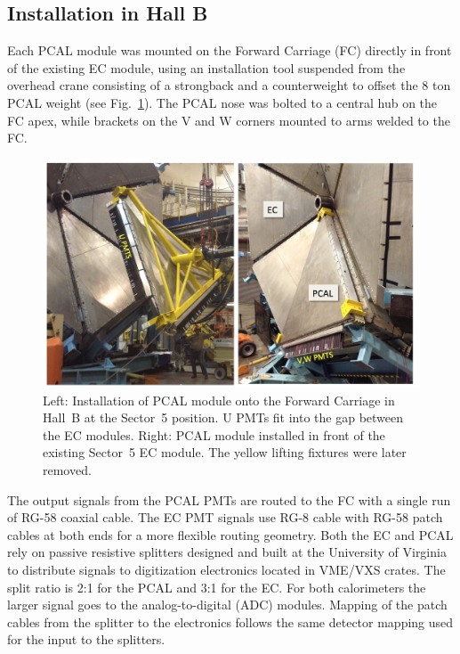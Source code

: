 \subsection{Installation in Hall B}

Each PCAL module was mounted on the Forward Carriage (FC) directly in front of the existing EC module, using
an installation tool suspended from the overhead crane consisting of a strongback and a counterweight to offset
the 8 ton PCAL weight (see Fig.~\ref{fig:S5_1}). The PCAL nose was bolted to a central hub on the FC apex, while
brackets on the V and W corners mounted to arms welded to the FC.   

\begin{figure}[hbt]
\centering
\includegraphics[width=0.95\columnwidth,keepaspectratio]{img/S5_1.png}
\caption{Left: Installation of PCAL module onto the Forward Carriage in Hall~B at the Sector~5 position. U PMTs
  fit into the gap between the EC modules. Right: PCAL module installed in front of the existing Sector~5 EC
  module. The yellow lifting fixtures were later removed.}
\label{fig:S5_1}
\end{figure}

The output signals from the PCAL PMTs are routed to the FC with a single run of RG-58 coaxial cable. The EC PMT
signals use RG-8 cable with RG-58 patch cables at both ends for a more flexible routing geometry. Both the EC and
PCAL rely on passive resistive splitters designed and built at the University of Virginia to distribute signals to 
digitization electronics located in VME/VXS crates. The split ratio is 2:1 for the PCAL and 3:1 for the EC. For both calorimeters the larger signal goes to the analog-to-digital (ADC) modules. Mapping of the patch cables from the
splitter to the electronics follows the same detector mapping used for the input to the splitters.

